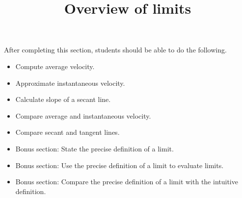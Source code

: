 \documentclass{ximera}
\title{Overview of limits}
\begin{document}
\begin{abstract}
\end{abstract}

\maketitle

\begin{sectionOutcomes}

After completing this section, students should be able to do the following.

\begin{itemize}
	\item Compute average velocity.
	\item Approximate instantaneous velocity.
	\item Calculate slope of a secant line.
	\item Compare average and instantaneous velocity.
	\item Compare secant and tangent lines.
	\item Bonus section: State the precise definition of a limit.
	\item Bonus section: Use the precise definition of a limit to evaluate limits.
	\item Bonus section: Compare the precise definition of a limit with the intuitive definition.
\end{itemize}

\end{sectionOutcomes}
\end{document}
